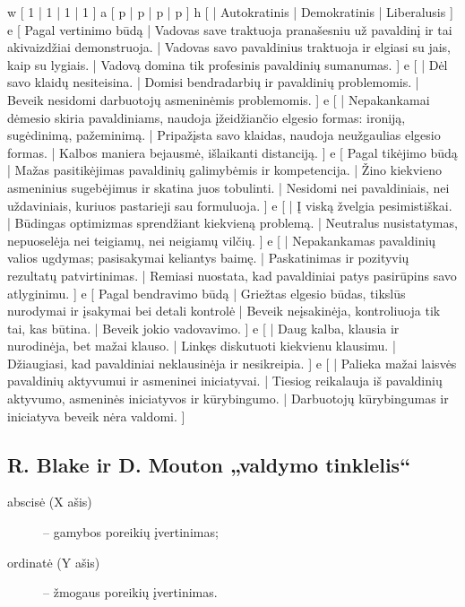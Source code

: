 \xtable
{
  w [ 1 | 1 | 1 | 1 ]
  a [ p | p | p | p ]
  h [ | Autokratinis | Demokratinis | Liberalusis ]
  e [ Pagal vertinimo būdą
    | Vadovas save traktuoja pranašesniu už pavaldinį ir tai akivaizdžiai 
      demonstruoja.
    | Vadovas savo pavaldinius traktuoja ir elgiasi su jais, kaip su
      lygiais.
    | Vadovą domina tik profesinis pavaldinių sumanumas. ]
  e [
    | Dėl savo klaidų nesiteisina.
    | Domisi bendradarbių ir pavaldinių problemomis.
    | Beveik nesidomi darbuotojų asmeninėmis problemomis. ]
  e [
    | Nepakankamai dėmesio skiria pavaldiniams, naudoja
      įžeidžiančio elgesio  formas: ironiją, sugėdinimą,
      pažeminimą.
    | Pripažįsta savo klaidas, naudoja neužgaulias elgesio formas.
    | Kalbos maniera bejausmė, išlaikanti distanciją. ]
  e [ Pagal tikėjimo būdą
    | Mažas pasitikėjimas pavaldinių galimybėmis ir kompetencija.
    | Žino kiekvieno asmeninius sugebėjimus ir skatina juos tobulinti.
    | Nesidomi nei pavaldiniais, nei uždaviniais, kuriuos pastarieji sau
      formuluoja.
    ]
  e [
    | Į viską žvelgia pesimistiškai.
    | Būdingas optimizmas sprendžiant kiekvieną problemą.
    | Neutralus nusistatymas, nepuoselėja nei teigiamų, nei neigiamų
      vilčių. ]
  e [
    | Nepakankamas pavaldinių valios ugdymas; pasisakymai keliantys baimę.
    | Paskatinimas ir pozityvių rezultatų patvirtinimas.
    | Remiasi nuostata, kad pavaldiniai patys pasirūpins savo atlyginimu.
    ]
  e [ Pagal bendravimo būdą
    | Griežtas elgesio būdas, tikslūs nurodymai ir įsakymai bei detali
      kontrolė
    | Beveik neįsakinėja, kontroliuoja tik tai, kas būtina.
    | Beveik jokio vadovavimo.
    ]
  e [
    | Daug kalba, klausia ir nurodinėja, bet mažai klauso.
    | Linkęs diskutuoti kiekvienu klausimu.
    | Džiaugiasi, kad pavaldiniai neklausinėja ir nesikreipia.
    ]
  e [
    | Palieka mažai laisvės pavaldinių aktyvumui ir asmeninei iniciatyvai.
    | Tiesiog reikalauja  iš pavaldinių aktyvumo, asmeninės iniciatyvos ir
      kūrybingumo.
    | Darbuotojų kūrybingumas ir iniciatyva beveik nėra valdomi.
    ]
}

\subsection{R. Blake ir D. Mouton „valdymo tinklelis“}

\begin{description}
  \item[abscisė (X ašis)] – gamybos poreikių įvertinimas;
  \item[ordinatė (Y ašis)] – žmogaus poreikių įvertinimas.
\end{description}

